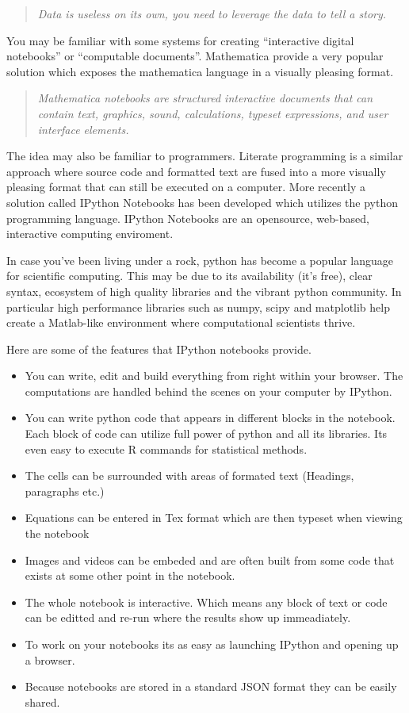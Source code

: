\documentclass[11pt, a4paper]{article}  %
\begin{document}
\begin{multicols}{2}
\begin{quote} 
\textit {Data is useless on its own, you need to leverage the data to tell a
story.}
\end{quote}

You may be familiar with some systems for creating ``interactive digital
notebooks'' or ``computable documents''. Mathematica provide a very popular
solution which exposes the mathematica language in a visually pleasing format.

\begin{quote}
\textit{ Mathematica notebooks are structured interactive documents that can
contain text, graphics, sound, calculations, typeset expressions, and user
interface elements.}
\end{quote}

The idea may also be familiar to programmers. Literate programming is a
similar approach where source code and formatted text are fused into a more
visually pleasing format that can still be executed on a computer. More
recently a solution called IPython Notebooks has been developed which utilizes
the python programming language. IPython Notebooks are an opensource,
web-based, interactive computing enviroment.

In case you've been living under a rock, python has become a popular language
for scientific computing. This may be due to its availability (it's free),
clear syntax, ecosystem of high quality libraries and the vibrant python
community. In particular high performance libraries such as numpy, scipy and
matplotlib help create a Matlab-like environment where computational scientists
thrive.

Here are some of the features that IPython notebooks provide.

\begin{itemize}
\item You can write, edit and build everything from right within your browser.
The computations are handled behind the scenes on your computer by
IPython.
\item You can write python code that appears in different blocks in the
notebook. Each block of code can utilize full power of python and all its
libraries. Its even easy to execute R commands for statistical methods.
\item The cells can be surrounded with areas of formated text (Headings,
paragraphs etc.)
\item Equations can be entered in Tex format which are then typeset when
viewing the notebook
\item Images and videos can be embeded and are often built from some code that
exists at some other point in the notebook.
\item The whole notebook is interactive. Which means any block of text or code
can be editted and re-run where the results show up immeadiately.
\item To work on your notebooks its as easy as launching IPython and opening
up a browser.
\item Because notebooks are stored in a standard JSON format they can be
easily shared.
\end{itemize}


\end{multicols}
\end{document}
